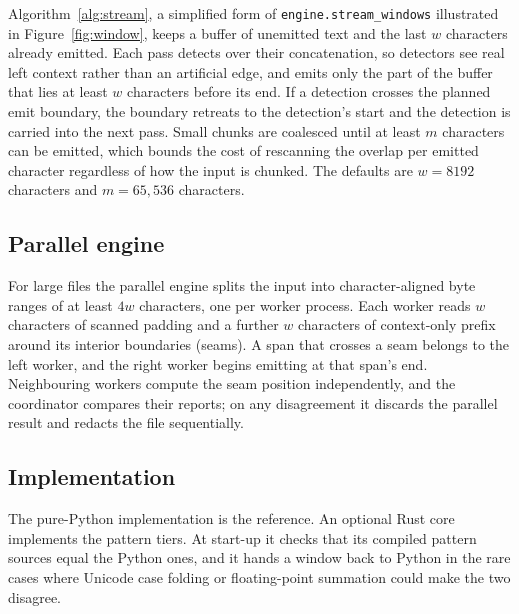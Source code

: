 Algorithm~\ref{alg:stream}, a simplified form of \texttt{engine.stream\_windows} illustrated in Figure~\ref{fig:window}, keeps a buffer of unemitted text and the last $w$ characters already emitted. Each pass detects over their concatenation, so detectors see real left context rather than an artificial edge, and emits only the part of the buffer that lies at least $w$ characters before its end. If a detection crosses the planned emit boundary, the boundary retreats to the detection's start and the detection is carried into the next pass. Small chunks are coalesced until at least $m$ characters can be emitted, which bounds the cost of rescanning the overlap per emitted character regardless of how the input is chunked. The defaults are $w = 8192$ characters and $m = 65{,}536$ characters.

\subsection{Parallel engine}
For large files the parallel engine splits the input into character-aligned byte ranges of at least $4w$ characters, one per worker process. Each worker reads $w$ characters of scanned padding and a further $w$ characters of context-only prefix around its interior boundaries (seams). A span that crosses a seam belongs to the left worker, and the right worker begins emitting at that span's end. Neighbouring workers compute the seam position independently, and the coordinator compares their reports; on any disagreement it discards the parallel result and redacts the file sequentially.

\subsection{Implementation}
The pure-Python implementation is the reference. An optional Rust core implements the pattern tiers. At start-up it checks that its compiled pattern sources equal the Python ones, and it hands a window back to Python in the rare cases where Unicode case folding or floating-point summation could make the two disagree.
